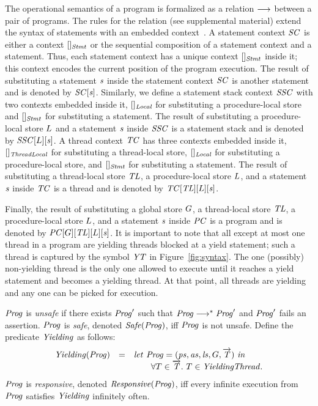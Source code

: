 The operational semantics of a \civl program is formalized as a relation $\longrightarrow$ between a pair of programs.
The rules for the relation (see supplemental material)
extend the syntax of statements with an embedded context~\cite{WrightF94}.
A statement context $\mathit{SC}$ is either a context $[]_{\mathit{Stmt}}$ or the sequential composition of a 
statement context and a statement.
Thus, each statement context has a unique context $[]_{\mathit{Stmt}}$ inside it;
this context encodes the current position of the program execution.
The result of substituting a statement $\mathit{s}$ inside the statement context $\mathit{SC}$ is another statement and is denoted by $\mathit{SC}[\mathit{s}]$.
Similarly, we define a statement stack context $\mathit{SSC}$ with two contexts embedded inside it, $[]_{\mathit{Local}}$ for substituting a procedure-local store
and $[]_{\mathit{Stmt}}$ for substituting a statement.
The result of substituting a procedure-local store $L$ and a statement $\mathit{s}$ inside $\mathit{SSC}$ is a statement stack and is denoted by $\mathit{SSC}[L][\mathit{s}]$.
A thread context $\mathit{TC}$ has three contexts embedded inside it, $[]_{\mathit{ThreadLocal}}$ for substituting a thread-local store, 
$[]_{\mathit{Local}}$ for substituting a procedure-local store, and $[]_{\mathit{Stmt}}$ for substituting a statement.
The result of substituting a thread-local store $\mathit{TL}$, a procedure-local store $L$, and a statement $\mathit{s}$ inside $\mathit{TC}$ 
is a thread and is denoted by $\mathit{TC}[\mathit{TL}][L][\mathit{s}]$.

Finally, the result of substituting a global store $G$, a thread-local store $\mathit{TL}$, a procedure-local store $L$, and a statement $\mathit{s}$ inside $\mathit{PC}$ 
is a program and is denoted by $\mathit{PC}[G][\mathit{TL}][L][\mathit{s}]$.
It is important to note that all except at most one thread in a program are yielding threads blocked at a yield statement;
such a thread is captured by the symbol $\mathit{YT}$ in Figure~\ref{fig:syntax}.
The one (possibly) non-yielding thread is the only one allowed to execute until it reaches a yield statement and becomes a yielding thread.
At that point, all threads are yielding and any one can be picked for execution.

$\mathit{Prog}$ is {\em unsafe\/} if there exists $\mathit{Prog}'$ such that $\mathit{Prog} \longrightarrow^* \mathit{Prog}'$ and $\mathit{Prog}'$ fails an assertion.
$\mathit{Prog}$ is {\em safe}, denoted $\mathit{Safe}(\mathit{Prog})$, iff $\mathit{Prog}$ is not unsafe.
Define the predicate $\mathit{Yielding}$ as follows:
\[
\begin{array}{lcl}
\mathit{Yielding}(\mathit{Prog}) & = & \mathit{let}\ \mathit{Prog} = (\mathit{ps}, \mathit{as}, \mathit{ls}, G, \overrightarrow{\mathit{T}})\ \mathit{in}\\
                 &   & ~~~~~~\forall T \in \overrightarrow{\mathit{T}}.\ T \in \mathit{YieldingThread}.
\end{array}
\]
$\mathit{Prog}$ is {\em responsive\/}, denoted $\mathit{Responsive}(\mathit{Prog})$, iff every infinite execution from $\mathit{Prog}$ satisfies $\mathit{Yielding}$ infinitely often.




